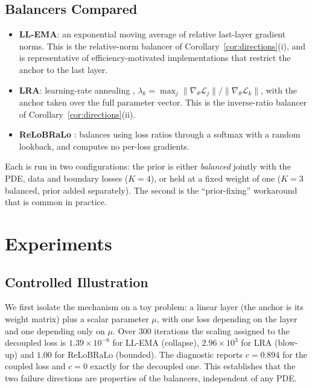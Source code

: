 \documentclass[a4paper,fleqn]{cas-sc}
\begin{document}
\subsection{Balancers Compared}

\begin{itemize}
\item \textbf{LL-EMA}: an exponential moving average of relative last-layer
gradient norms. This is the relative-norm balancer of
Corollary~\ref{cor:directions}(i), and is representative of
efficiency-motivated implementations that restrict the anchor to the last
layer.
\item \textbf{LRA}: learning-rate annealing \citep{wang2021understanding},
$\lambda_k = \max_j \lVert\nabla_\theta \mathcal{L}_j\rVert /
\lVert\nabla_\theta \mathcal{L}_k\rVert$, with the anchor taken over the full
parameter vector. This is the inverse-ratio balancer of
Corollary~\ref{cor:directions}(ii).
\item \textbf{ReLoBRaLo} \citep{bischof2021multi}: balances using loss ratios
through a softmax with a random lookback, and computes no per-loss gradients.
\end{itemize}

Each is run in two configurations: the prior is either \emph{balanced}
jointly with the PDE, data and boundary losses ($K=4$), or held at a fixed
weight of one ($K=3$ balanced, prior added separately). The second is the
``prior-fixing'' workaround that is common in practice.

\section{Experiments}
\label{sec:experiments}

\subsection{Controlled Illustration}

We first isolate the mechanism on a toy problem: a linear layer (the anchor is
its weight matrix) plus a scalar parameter $\mu$, with one loss depending on
the layer and one depending only on $\mu$. Over 300 iterations the scaling
assigned to the decoupled loss is $1.39\times10^{-8}$ for LL-EMA (collapse),
$2.96\times10^{3}$ for LRA (blow-up) and $1.00$ for ReLoBRaLo (bounded). The
diagnostic reports $c = 0.894$ for the coupled loss and $c = 0$ exactly for the
decoupled one. This establishes that the two failure directions are properties
of the balancers, independent of any PDE.
\end{document}
